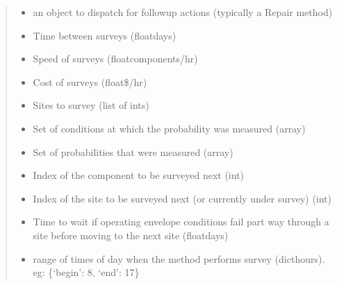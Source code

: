 \documentclass[letterpaper,10pt,english]{sphinxmanual}
\begin{document}
\begin{fulllineitems}
\begin{quote}
\begin{description}
\begin{itemize}
\item {} 
 \textendash{} an object to dispatch for follow\sphinxhyphen{}up actions (typically a Repair method)

\item {} 
 \textendash{} Time between surveys (float\textendash{}days)

\item {} 
 \textendash{} Speed of surveys (float\textendash{}components/hr)

\item {} 
 \textendash{} Cost of surveys (float\textendash{}\$/hr)

\item {} 
 \textendash{} Sites to survey (list of ints)

\item {} 
 \textendash{} Set of conditions at which the probability was measured (array)

\item {} 
 \textendash{} Set of probabilities that were measured (array)

\item {} 
 \textendash{} Index of the component to be surveyed next (int)

\item {} 
 \textendash{} Index of the site to be surveyed next (or currently under survey) (int)

\item {} 
 \textendash{} Time to wait if operating envelope conditions fail part way through a site before
moving to the next site (float\textendash{}days)

\item {} 
 \textendash{} range of times of day when the method performs survey (dict\textendash{}hours). eg: \{‘begin’: 8, ‘end’: 17\}

\end{itemize}


\end{description}
\end{quote}
\end{fulllineitems}
\end{document}
